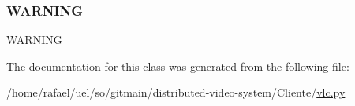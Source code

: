 \mbox{\label{classvlc_1_1_log_level_a1dfc73ab73898d3f4f348d462a5d126a}} 
\subsubsection{\texorpdfstring{W\+A\+R\+N\+I\+NG}{WARNING}}
{\footnotesize\ttfamily W\+A\+R\+N\+I\+NG\hspace{0.3cm}{\ttfamily [static]}}



The documentation for this class was generated from the following file\+:\begin{DoxyCompactItemize}
\item 
/home/rafael/uel/so/gitmain/distributed-\/video-\/system/\+Cliente/\hyperlink{vlc_8py}{vlc.\+py}\end{DoxyCompactItemize}
